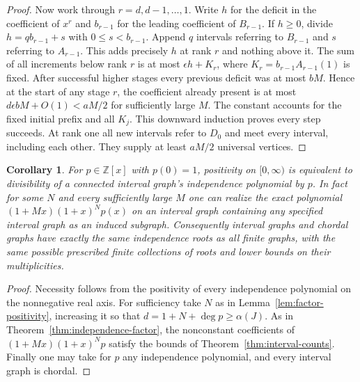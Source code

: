 \documentclass[11pt,a4paper]{article}
\newtheorem{corollary}[theorem]{Corollary}
\begin{document}
\begin{proof}
Now work through $r=d,d-1,\ldots,1$. Write $h$ for the deficit in the
coefficient of $x^r$ and $b_{r-1}$ for the leading coefficient of
$B_{r-1}$. If $h\ge0$, divide $h=qb_{r-1}+s$ with
$0\le s<b_{r-1}$. Append $q$ intervals referring to $B_{r-1}$
and $s$ referring to $A_{r-1}$. This adds precisely $h$ at rank $r$
and nothing above it. The sum of all increments below rank $r$ is at
most $\epsilon h+K_r$, where $K_r=b_{r-1}A_{r-1}(1)$ is fixed.
After successful higher stages every previous deficit was at most $bM$.
Hence at the start of any stage $r$, the coefficient already present
is at most $d\epsilon bM+O(1)<aM/2$ for sufficiently large $M$.
The constant accounts for the fixed initial prefix and all $K_j$.
This downward induction proves every step succeeds. At rank one all
new intervals refer to $D_0$ and meet every interval, including each
other. They supply at least $aM/2$ universal vertices.
\end{proof}

\begin{corollary}\label{cor:interval-factor}
For $p\in\mathbb Z[x]$ with $p(0)=1$, positivity on $[0,\infty)$
is equivalent to divisibility of a connected interval graph's
independence polynomial by $p$. In fact for some $N$ and every
sufficiently large $M$ one can realize the exact polynomial
$(1+Mx)(1+x)^Np(x)$ on an interval graph containing any specified
interval graph as an induced subgraph. Consequently interval graphs
and chordal graphs have exactly the same independence roots as all
finite graphs, with the same possible prescribed finite collections
of roots and lower bounds on their multiplicities.
\end{corollary}
\begin{proof}
Necessity follows from the positivity of every independence polynomial
on the nonnegative real axis. For sufficiency take $N$ as in
Lemma~\ref{lem:factor-positivity}, increasing it so that
$d=1+N+\deg p\ge\alpha(J)$. As in Theorem~\ref{thm:independence-factor},
the nonconstant coefficients of $(1+Mx)(1+x)^Np$ satisfy the
bounds of Theorem~\ref{thm:interval-counts}. Finally one may take for
$p$ any independence polynomial, and every interval graph is chordal.
\end{proof}
\end{document}
